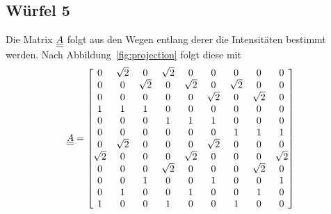 \subsection{Würfel 5}
Die Matrix $\underline{\underline{A}}$ folgt aus den Wegen entlang derer die Intensitäten bestimmt werden.
Nach Abbildung~\ref{fig:projection} folgt diese mit
\begin{equation}
    \underline{\underline{A}} = \begin{bmatrix}
    0 & \sqrt{2} & 0 & \sqrt{2} & 0 & 0 & 0 & 0 & 0 \\
    0 & 0 & \sqrt{2} & 0 & \sqrt{2} & 0 & \sqrt{2} & 0 & 0 \\
    0 & 0 & 0 & 0 & 0 & \sqrt{2} & 0 & \sqrt{2} & 0 \\
    1 & 1 & 1 & 0 & 0 & 0 & 0 & 0 & 0 \\
    0 & 0 & 0 & 1 & 1 & 1 & 0 & 0 & 0 \\
    0 & 0 & 0 & 0 & 0 & 0 & 1 & 1 & 1 \\
    0 & \sqrt{2} & 0 & 0 & 0 & \sqrt{2} & 0 & 0 & 0 \\
    \sqrt{2} & 0 & 0 & 0 & \sqrt{2} & 0 & 0 & 0 & \sqrt{2} \\
    0 & 0 & 0 & \sqrt{2} & 0 & 0 & 0 & \sqrt{2} & 0 \\
    0 & 0 & 1 & 0 & 0 & 1 & 0 & 0 & 1 \\
    0 & 1 & 0 & 0 & 1 & 0 & 0 & 1 & 0 \\
    1 & 0 & 0 & 1 & 0 & 0 & 1 & 0 & 0 \\
\end{bmatrix}
\end{equation}

